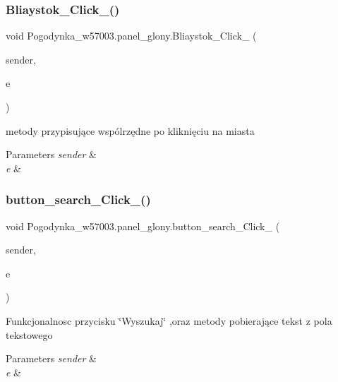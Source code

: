 \subsubsection{\texorpdfstring{Bliaystok\+\_\+\+Click\+\_()}{Bliaystok\_Click\_1()}}
{\footnotesize\ttfamily void Pogodynka\+\_\+w57003.\+panel\+\_\+glony.\+Bliaystok\+\_\+\+Click\+\_ (\begin{DoxyParamCaption}\item[{object}]{sender,  }\item[{Event\+Args}]{e }\end{DoxyParamCaption})\hspace{0.3cm}{\ttfamily [private]}}



metody przypisujące wspólrzędne po kliknięciu na miasta 


\begin{DoxyParams}{Parameters}
{\em sender} & \\
\hline
{\em e} & \\
\hline
\end{DoxyParams}
\mbox{\label{class_pogodynka__w57003_1_1panel__glony_a0ecf75f825f5031f164a81ea0e61de1c}} 
\subsubsection{\texorpdfstring{button\+\_\+search\+\_\+\+Click\+\_()}{button\_search\_Click\_1()}}
{\footnotesize\ttfamily void Pogodynka\+\_\+w57003.\+panel\+\_\+glony.\+button\+\_\+search\+\_\+\+Click\+\_ (\begin{DoxyParamCaption}\item[{object}]{sender,  }\item[{Event\+Args}]{e }\end{DoxyParamCaption})\hspace{0.3cm}{\ttfamily [private]}}



Funkcjonalnosc przycisku \char`\"{}\+Wyszukaj\char`\"{} ,oraz metody pobierające tekst z pola tekstowego 


\begin{DoxyParams}{Parameters}
{\em sender} & \\
\hline
{\em e} & \\
\hline
\end{DoxyParams}
\mbox{\label{class_pogodynka__w57003_1_1panel__glony_af7cfae8068adcc3589d5b990b982e226}} 
